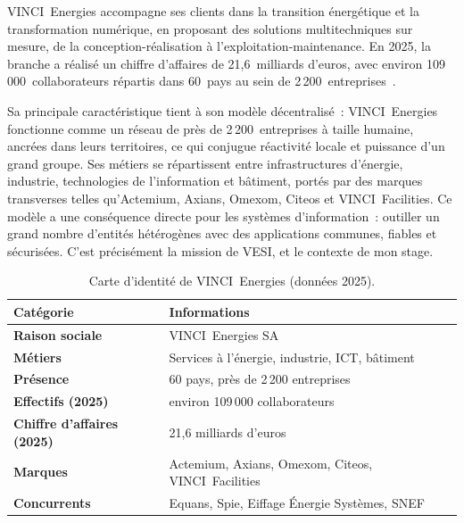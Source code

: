 VINCI~Energies accompagne ses clients dans la transition énergétique et la
transformation numérique, en proposant des solutions multitechniques sur
mesure, de la conception-réalisation à l'exploitation-maintenance. En 2025,
la branche a réalisé un chiffre d'affaires de 21,6~milliards d'euros, avec
environ 109\,000~collaborateurs répartis dans 60~pays au sein de
2\,200~entreprises~\cite{ve_chiffres_cles}.

Sa principale caractéristique tient à son modèle décentralisé~:
VINCI~Energies fonctionne comme un réseau de près de 2\,200~entreprises à
taille humaine, ancrées dans leurs territoires, ce qui conjugue réactivité
locale et puissance d'un grand groupe. Ses métiers se répartissent entre
infrastructures d'énergie, industrie, technologies de l'information et
bâtiment, portés par des marques transverses telles qu'Actemium, Axians,
Omexom, Citeos et VINCI~Facilities. Ce modèle a une conséquence directe pour
les systèmes d'information~: outiller un grand nombre d'entités hétérogènes
avec des applications communes, fiables et sécurisées. C'est précisément la
mission de VESI, et le contexte de mon stage.


\begin{table}[H]
  \centering
  \caption{Carte d'identité de VINCI~Energies (données 2025).}
  \label{tab:carte-ve}
  \begin{tabularx}{\textwidth}{>{\bfseries}p{4.2cm} X}
    \toprule
    \normalfont\bfseries Catégorie & \bfseries Informations \\
    \midrule
    Raison sociale        & VINCI~Energies SA \\
    Métiers               & Services à l'énergie, industrie, ICT, bâtiment \\
    Présence              & 60 pays, près de 2\,200 entreprises \\
    Effectifs (2025)      & environ 109\,000 collaborateurs \\
    Chiffre d'affaires (2025) & 21,6 milliards d'euros \\
    Marques               & Actemium, Axians, Omexom, Citeos, VINCI~Facilities \\
    Concurrents           & Equans, Spie, Eiffage Énergie Systèmes, SNEF \\
    \bottomrule
  \end{tabularx}
\end{table}

